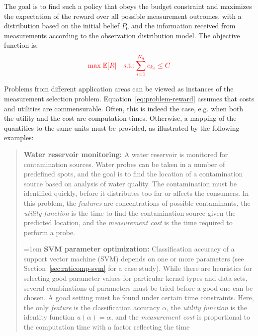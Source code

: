 The goal is to find such a policy that obeys the budget constraint and maximizes
the expectation of the reward \chg{(\ref{eq:problem-reward})} over all possible measurement outcomes,
with a distribution based on the initial belief
$P_0$ and the information received from measurements
according to the observation distribution model. The objective function is:
\begin{equation}
\label{eq:max-expected-reward}
{\color{red} \mbox{max}\;\ensuremath {\mathbb{E}}[R]\quad\mbox{s.t.:}\sum_{i=1}^{N_q}c_{k_i}\le C}
\end{equation}

Problems from different application areas can be viewed as instances
of the measurement selection problem. Equation~\ref{eq:problem-reward} assumes
that costs and utilities are commensurable. Often, this is indeed the
case, e.g. when both the utility and the cost are computation
times. Otherwise, a mapping of the quantities to the same units must
be provided, as illustrated by the following examples:

\begin{quote}
{\bf Water reservoir monitoring:} A water reservoir is monitored for
contamination sources. Water probes can be taken in a number of
predefined spots, and the goal is to find the location of a
contamination source based on analysis of water quality. The
contamination must be identified quickly, before it distributes too
far or affects the consumers. In this problem, the {\em features} are
concentrations of possible contaminants, the {\em utility function} is
the time to find the contamination source given the predicted
location, and the {\em measurement cost} is the time required to
perform a probe.

\hangindent=1em
{\bf SVM parameter optimization:} Classification accuracy of a support
vector machine (SVM) depends on one or more parameters (see
Section~\ref{sec:raticomp-svm} for a case study). While there are heuristics
for selecting good parameter values for particular kernel types and
data sets, several combinations of parameters must be tried before a
good one can be chosen. A good setting must be found under certain time
constraints. Here, the only {\em feature} is the classification
accuracy $\alpha$, the {\em utility function} is the identity function
$u(\alpha)=\alpha$, and the {\em measurement cost} is proportional to
the computation time with a factor reflecting the time  
\end{quote}

